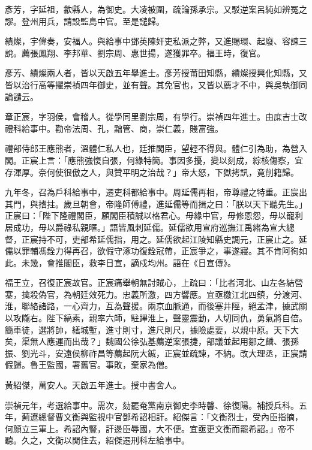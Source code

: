 \begin{pinyinscope}
彥芳，字延祖，歙縣人，為御史。大凌被圍，疏論孫承宗。又駁逆案呂純如辨冤之謬。登州用兵，請設監島中官。至是譴歸。

績燦，宇偉奏，安福人。與給事中鄧英陳奸吏私派之弊，又進賜環、起廢、容諫三說。薦張鳳翔、李邦華、劉宗周、惠世揚，遂獲罪卒。福王時，復官。

彥芳、績燦兩人者，皆以天啟五年舉進士。彥芳授莆田知縣，績燦授興化知縣，又皆以治行高等擢崇禎四年御史，並有聲。其免官也，又皆以薦才不中，與吳執御同論譴云。

章正宸，字羽侯，會稽人。從學同里劉宗周，有學行。崇禎四年進士。由庶吉士改禮科給事中。勸帝法周、孔，黜管、商，崇仁義，賤富強。

禮部侍郎王應熊者，溫體仁私人也，廷推閣臣，望輕不得與。體仁引為助，為營入閣。正宸上言：「應熊強愎自張，何緣特簡。事因多擾，變以刻成，綜核傷察，宜存渾厚。奈何使很傲之人，與贊平明之治哉？」帝大怒，下獄拷訊，竟削籍歸。

九年冬，召為戶科給事中，遷吏科都給事中。周延儒再相，帝尊禮之特重。正宸出其門，與搘拄。歲旦朝會，帝隆師傅禮，進延儒等而揖之曰：「朕以天下聽先生。」正宸曰：「陛下隆禮閣臣，願閣臣積誠以格君心。毋緣中官，毋修恩怨，毋以寵利居成功，毋以爵祿私親暱。」語皆風刺延儒。延儒欲用宣府巡撫江禹緒為宣大總督，正宸持不可，吏部希延儒指，用之。延儒欲起江陵知縣史調元，正宸止之。延儒以罪輔馮銓力得再召，欲假守涿功復銓冠帶，正宸爭之，事遂寢。其不肯阿徇如此。未幾，會推閣臣，救李日宣，謫戍均州。語在《日宣傳》。

福王立，召復正宸故官。正宸痛舉朝無討賊心，上疏曰：「比者河北、山左各結營寨，擒殺偽官，為朝廷效死力。忠義所激，四方響應。宜亟檄江北四鎮，分渡河、淮，聯絡諸路，一心齊力，互為聲援。兩京血脈通，而後塞井陘，絕孟津，據武關以攻隴右。陛下縞素，親率六師，駐蹕淮上，聲靈震動，人切同仇，勇氣將自倍。簡車徒，選將帥，繕城塹，進寸則寸，進尺則尺，據險處要，以規中原。天下大矣，渠無人應運而出哉？」魏國公徐弘基薦逆案張捷，部議並起用鄒之麟、張孫振、劉光斗，安遠侯柳祚昌等薦起阮大鋮，正宸並疏諫，不納。改大理丞，正宸請假歸。魯王監國，署舊官。事敗，棄家為僧。

黃紹傑，萬安人。天啟五年進士。授中書舍人。

崇禎元年，考選給事中。需次，劾罷奄黨南京御史李時馨、徐復陽。補授兵科。五年，薊遼總督曹文衡與監視中官鄧希詔相訐。紹傑言：「文衡烈士，受內臣指摘，何顏立三軍上。希詔內豎，訐邊臣辱國，大不便。宜亟更文衡而罷希詔。」帝不聽。久之，文衡以閒住去，紹傑遷刑科左給事中。


\end{pinyinscope}
